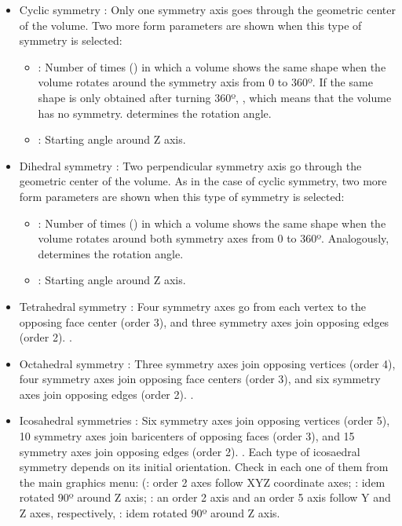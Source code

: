 \begin{itemize}
\begin{itemize}
  \begin{itemize}
  \item Cyclic symmetry : Only one symmetry axis goes through the geometric center of the volume. Two more form parameters are shown when this type of symmetry is selected:
   \begin{itemize}
    \item {}: Number of times () in which a volume shows the same shape when the volume rotates around the symmetry axis from 0 to 360º. If the same shape is only obtained after turning 360º, , which means that the volume has no symmetry.  determines the rotation angle. 
	\item {}: Starting angle around Z axis. 
   \end{itemize}
  \item Dihedral symmetry : Two perpendicular symmetry axis go through the geometric center of the volume. As in the case of cyclic symmetry, two more form parameters are shown when this type of symmetry is selected:
   \begin{itemize}
    \item {}: Number of times () in which a volume shows the same shape when the volume rotates around both symmetry axes from 0 to 360º. Analogously,  determines the rotation angle. 
	\item {}: Starting angle around Z axis. 
   \end{itemize}
  \item Tetrahedral symmetry : Four symmetry axes go from each vertex to the opposing face center (order 3), and three symmetry axes join opposing edges (order 2). .
  \item Octahedral symmetry : Three symmetry axes join opposing vertices (order 4), four symmetry axes join opposing face centers (order 3), and six symmetry axes join opposing edges (order 2). .
  \item Icosahedral symmetries : Six symmetry axes join opposing vertices (order 5), 10 symmetry axes join baricenters of opposing faces (order 3), and 15 symmetry axes join opposing edges (order 2). . Each type of icosaedral symmetry depends on its initial orientation. Check in \chimera each one of them from the main graphics menu:  (: order 2 axes follow XYZ coordinate axes; : idem rotated 90º around Z axis; : an order 2 axis and an order 5 axis follow Y and Z axes, respectively, : idem rotated 90º around Z axis.
  \end{itemize}
  

\end{itemize}
\end{itemize}
